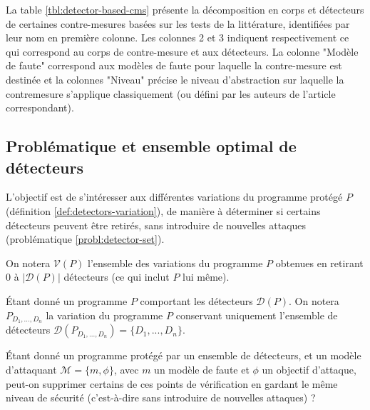             La table \ref{tbl:detector-based-cms} présente la décomposition en corps et détecteurs de certaines contre-mesures basées sur les tests de la littérature, identifiées par leur nom en première colonne. Les colonnes 2 et 3 indiquent respectivement ce qui correspond au corps de contre-mesure et aux détecteurs. La colonne "Modèle de faute" correspond aux modèles de faute pour laquelle la contre-mesure est destinée et la colonnes "Niveau" précise le niveau d'abstraction sur laquelle la contremesure s'applique classiquement (ou défini par les auteurs de l'article correspondant). 
            
        \subsection{Problématique et ensemble optimal de détecteurs}
        \label{sec:cm-problematic}

            L'objectif est de s'intéresser aux différentes variations du programme protégé $P$ (définition \ref{def:detectors-variation}), de manière à déterminer si certains détecteurs peuvent être retirés, sans introduire de nouvelles attaques (problématique \ref{probl:detector-set}).
            
            \begin{defi}
                \label{def:detectors-variation}
                On notera $\mathcal{V}(P)$ l'ensemble des variations du programme $P$ obtenues en retirant 0 à $|\mathcal{D}(P)|$ détecteurs (ce qui inclut $P$ lui même).
            \end{defi}
            
            \begin{defi}
                \label{def:detectors-derive}
                Étant donné un programme $P$ comportant les détecteurs $\mathcal{D}(P)$. 
                On notera $P_{D_1, ..., D_n}$ la variation du programme $P$ conservant uniquement l'ensemble de détecteurs $\mathcal{D}(P_{D_1, ..., D_n}) = \{D_1, ..., D_n\}$.
            \end{defi}

            \begin{probl}
                \label{probl:detector-set}
                Étant donné un programme protégé par un ensemble de détecteurs, et un modèle d'attaquant $\mathcal{M} = \{m, \phi\}$, avec $m$ un modèle de faute et $\phi$ un objectif d'attaque, peut-on supprimer certains de ces points de vérification en gardant le même niveau de sécurité (c'est-à-dire sans introduire de nouvelles attaques) ?
            \end{probl}
            

